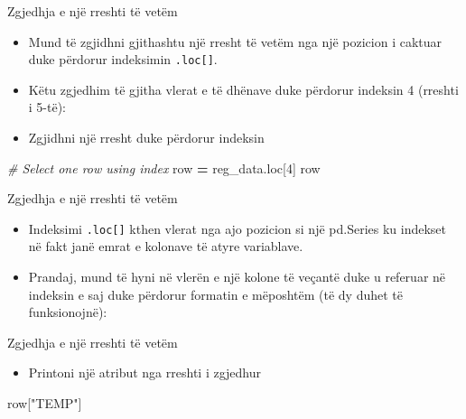 \documentclass[
  ignorenonframetext,
]{beamer}
\newenvironment{Shaded}{\begin{snugshade}}{\end{snugshade}}
\newcommand{\CommentTok}[1]{\textcolor[rgb]{0.56,0.35,0.01}{\textit{#1}}}
\newcommand{\DecValTok}[1]{\textcolor[rgb]{0.00,0.00,0.81}{#1}}
\newcommand{\NormalTok}[1]{#1}
\newcommand{\OperatorTok}[1]{\textcolor[rgb]{0.81,0.36,0.00}{\textbf{#1}}}
\newcommand{\StringTok}[1]{\textcolor[rgb]{0.31,0.60,0.02}{#1}}
\providecommand{\tightlist}{%
  \setlength{\itemsep}{0pt}\setlength{\parskip}{0pt}}
\begin{document}
\begin{frame}[fragile]{Zgjedhja e një rreshti të vetëm}
\protect\hypertarget{zgjedhja-e-njuxeb-rreshti-tuxeb-vetuxebm}{}
\begin{itemize}
\item
  Mund të zgjidhni gjithashtu një rresht të vetëm nga një pozicion i
  caktuar duke përdorur indeksimin \texttt{.loc{[}{]}}.
\item
  Këtu zgjedhim të gjitha vlerat e të dhënave duke përdorur indeksin 4
  (rreshti i 5-të):
\item
  Zgjidhni një rresht duke përdorur indeksin
\end{itemize}

\begin{Shaded}
\begin{Highlighting}[]
\CommentTok{\# Select one row using index}
\NormalTok{row }\OperatorTok{=}\NormalTok{ reg\_data.loc[}\DecValTok{4}\NormalTok{]}
\NormalTok{row}
\end{Highlighting}
\end{Shaded}
\end{frame}

\begin{frame}[fragile]{Zgjedhja e një rreshti të vetëm}
\protect\hypertarget{zgjedhja-e-njuxeb-rreshti-tuxeb-vetuxebm-1}{}
\begin{itemize}
\item
  Indeksimi \texttt{.loc{[}{]}} kthen vlerat nga ajo pozicion si një
  pd.Series ku indekset në fakt janë emrat e kolonave të atyre
  variablave.
\item
  Prandaj, mund të hyni në vlerën e një kolone të veçantë duke u
  referuar në indeksin e saj duke përdorur formatin e mëposhtëm (të dy
  duhet të funksionojnë):
\end{itemize}
\end{frame}

\begin{frame}[fragile]{Zgjedhja e një rreshti të vetëm}
\protect\hypertarget{zgjedhja-e-njuxeb-rreshti-tuxeb-vetuxebm-2}{}
\begin{itemize}
\tightlist
\item
  Printoni një atribut nga rreshti i zgjedhur
\end{itemize}

\begin{Shaded}
\begin{Highlighting}[]
\NormalTok{row[}\StringTok{"TEMP"}\NormalTok{]}
\end{Highlighting}
\end{Shaded}
\end{frame}
\end{document}
